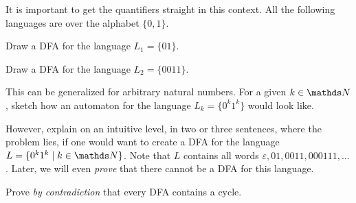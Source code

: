 \documentclass{exercise}
\begin{document}

\newpage

\subtask It is important to get the quantifiers straight in this context.  All the following
  languages are over the alphabet $\{0,1\}$.
  \begin{taskitems}
    \item Draw a DFA for the language $L_1=\{01\}$.
    \item Draw a DFA for the language $L_2=\{0011\}$.
    \item This can be generalized for arbitrary natural numbers.  For a given $k\in\nat$,
      sketch how an automaton for the language $L_k=\{0^k1^k\}$ would look like. 
    \item However, explain on an intuitive level, in two or three sentences, where the problem lies, if one
      would want to create a DFA for the language $L=\{0^k1^k\mid k\in\nat\}$.  Note that $L$ contains all words
      $\varepsilon,01,0011,000111,\dots$.  Later, we will even \emph{prove} that there
      cannot be a DFA for this language.
  \end{taskitems}



Prove \emph{by contradiction} that every DFA contains a cycle.

\end{document}
